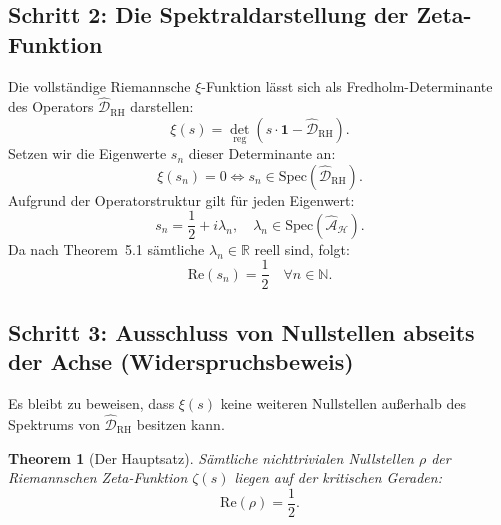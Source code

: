 \documentclass[11pt,a4paper]{article}
\newtheorem{theorem}{Theorem}[section]
\theoremstyle{definition}
\theoremstyle{remark}
\numberwithin{equation}{section}
\begin{document}
\subsection{Schritt 2: Die Spektraldarstellung der Zeta-Funktion}

Die vollständige Riemannsche $\xi$-Funktion lässt sich als Fredholm-Determinante des Operators $\hat{\mathcal{D}}_{\mathrm{RH}}$ darstellen:
\begin{equation}
\xi(s) = {\det}_{\mathrm{reg}}\left( s \cdot \mathbf{1} - \hat{\mathcal{D}}_{\mathrm{RH}} \right).
\end{equation}
Setzen wir die Eigenwerte $s_n$ dieser Determinante an:
\begin{equation}
\xi(s_n) = 0 \iff s_n \in \mathrm{Spec}(\hat{\mathcal{D}}_{\mathrm{RH}}).
\end{equation}
Aufgrund der Operatorstruktur gilt für jeden Eigenwert:
\begin{equation}
s_n = \frac{1}{2} + i \lambda_n, \quad \lambda_n \in \mathrm{Spec}(\hat{\mathcal{A}}_{\mathcal{H}}).
\end{equation}
Da nach Theorem~5.1 sämtliche $\lambda_n \in \mathbb{R}$ reell sind, folgt:
\begin{equation}
\mathrm{Re}(s_n) = \frac{1}{2} \quad \forall n \in \mathbb{N}.
\end{equation}

\subsection{Schritt 3: Ausschluss von Nullstellen abseits der Achse (Widerspruchsbeweis)}

Es bleibt zu beweisen, dass $\xi(s)$ keine weiteren Nullstellen außerhalb des Spektrums von $\hat{\mathcal{D}}_{\mathrm{RH}}$ besitzen kann.

\begin{theorem}[Der Hauptsatz]
Sämtliche nichttrivialen Nullstellen $\rho$ der Riemannschen Zeta-Funktion $\zeta(s)$ liegen auf der kritischen Geraden:
\begin{equation}
\mathrm{Re}(\rho) = \frac{1}{2}.
\end{equation}
\end{theorem}
\end{document}
